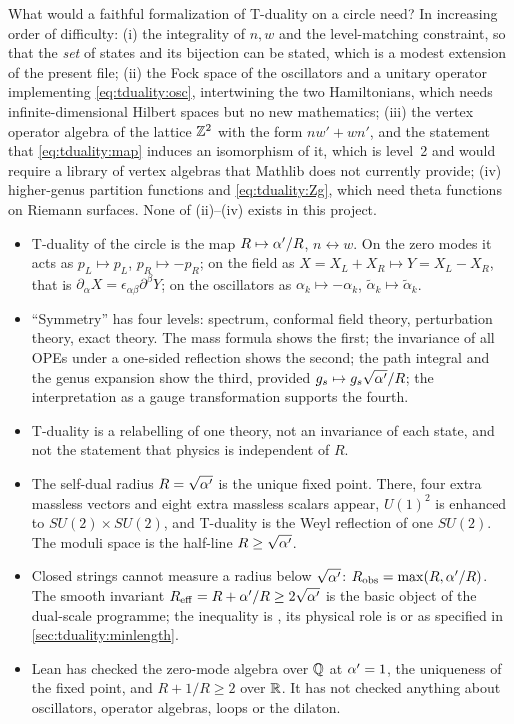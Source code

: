 What would a faithful formalization of T-duality on a circle need? In increasing order of
difficulty: (i) the integrality of $n,w$ and the level-matching constraint, so that the
\emph{set} of states and its bijection can be stated, which is a modest extension of the present
file; (ii) the Fock space of the oscillators and a unitary operator implementing
\eqref{eq:tduality:osc}, intertwining the two Hamiltonians, which needs infinite-dimensional
Hilbert spaces but no new mathematics; (iii) the vertex operator algebra of the lattice
$\mathbb{Z}^2$ with the form $nw'+wn'$, and the statement that \eqref{eq:tduality:map} induces an isomorphism
of it, which is level~2 and would require a library of vertex algebras that Mathlib does not
currently provide; (iv) higher-genus partition functions and \eqref{eq:tduality:Zg}, which need
theta functions on Riemann surfaces. None of (ii)--(iv) exists in this project.

\begin{summarybox}
\begin{itemize}[leftmargin=*]
\item T-duality of the circle is the map $R\mapsto\alpha'/R$, $n\leftrightarrow w$. On the zero modes
 it acts as $p_L\mapsto p_L$, $p_R\mapsto-p_R$; on the field as $X=X_L+X_R\mapsto Y=X_L-X_R$, that is
 $\partial_\alpha X=\epsilon_{\alpha\beta}\partial^\beta Y$; on the oscillators as
 $\alpha_k\mapsto-\alpha_k$, $\tilde\alpha_k\mapsto\tilde\alpha_k$.
\item ``Symmetry'' has four levels: spectrum, conformal field theory, perturbation theory, exact
 theory. The mass formula shows the first; the invariance of all OPEs under a one-sided
 reflection shows the second; the path integral and the genus expansion show the third,
 provided $g_s\mapsto g_s\sqrt{\alpha'}/R$; the interpretation as a gauge transformation supports
 the fourth.
\item T-duality is a relabelling of one theory, not an invariance of each state, and not the
 statement that physics is independent of $R$.
\item The self-dual radius $R=\sqrt{\alpha'}$ is the unique fixed point. There, four extra massless
 vectors and eight extra massless scalars appear, $U(1)^2$ is enhanced to $SU(2)\times SU(2)$, and
 T-duality is the Weyl reflection of one $SU(2)$. The moduli space is the half-line
 $R\ge\sqrt{\alpha'}$.
\item Closed strings cannot measure a radius below $\sqrt{\alpha'}$: $R_{\rm obs}=\max(R,\alpha'/R)$. The
 smooth invariant $R_{\rm eff}=R+\alpha'/R\ge2\sqrt{\alpha'}$ is the basic object of the dual-scale
 programme; the inequality is \TA, its physical role is \TL{} or \TC{} as specified in
 \cref{sec:tduality:minlength}.
\item Lean has checked the zero-mode algebra over $\mathbb{Q}$ at $\alpha'=1$, the uniqueness of the fixed
 point, and $R+1/R\ge2$ over $\mathbb{R}$. It has not checked anything about oscillators, operator
 algebras, loops or the dilaton.
\end{itemize}
\end{summarybox}

